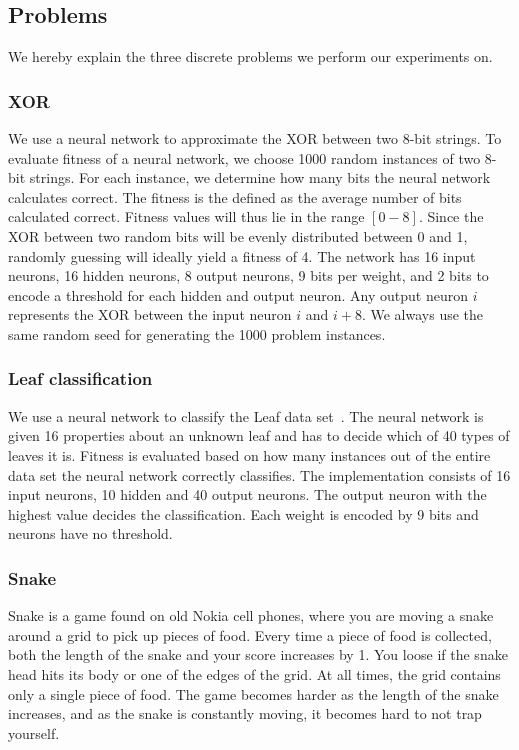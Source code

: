 \subsection{Problems}
\label{sec:problems}
We hereby explain the three discrete problems we perform our experiments on.

\subsubsection{XOR}
We use a neural network to approximate the XOR between two 8-bit strings.
To evaluate fitness of a neural network, we choose 1000 random instances of two 8-bit strings.
For each instance, we determine how many bits the neural network calculates correct.
The fitness is the defined as the average number of bits calculated correct.
Fitness values will thus lie in the range $[0-8]$.
Since the XOR between two random bits will be evenly distributed between 0 and 1,
randomly guessing will ideally yield a fitness of 4.
The network has 16 input neurons, 16 hidden neurons, 8 output neurons, 9 bits per weight, and 2 bits to encode a threshold for each hidden and output neuron. Any output neuron $i$ represents the XOR between the input neuron $i$ and $i+8$. 
We always use the same random seed for generating the 1000 problem instances.

\subsubsection{Leaf classification}
We use a neural network to classify the Leaf data set~\cite{Bache+Lichman:2013, leafdataset}.
The neural network is given 16 properties about an unknown leaf and has to decide which of 40 types of leaves it is.
Fitness is evaluated based on how many instances out of the entire data set the neural network correctly classifies.
The implementation consists of 16 input neurons, 10 hidden and 40 output neurons. The output neuron with the highest value decides the classification. Each weight is encoded by 9 bits and neurons have no threshold.

\subsubsection{Snake}
Snake is a game found on old Nokia cell phones, where you are moving a snake around a grid to pick up pieces of food.
Every time a piece of food is collected, both the length of the snake and your score increases by 1.
You loose if the snake head hits its body or one of the edges of the grid.
At all times, the grid contains only a single piece of food.
The game becomes harder as the length of the snake increases, and as the snake is constantly moving, it becomes hard to not trap yourself.

